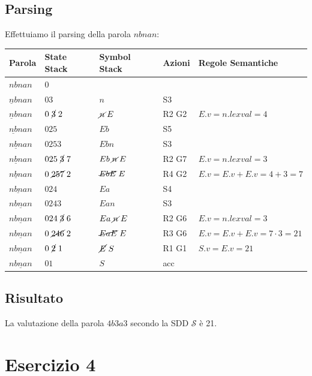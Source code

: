 \documentclass[11pt]{article}
\begin{document}
\subsection*{Parsing}
Effettuiamo il parsing della parola $nbnan$:
\begin{table}[H]
  \begin{tabular}{lllll}
    \textbf{Parola} & \textbf{State Stack} & \textbf{Symbol Stack} & \textbf{Azioni} & \textbf{Regole Semantiche}\\
    \hline
    $nbnan$ & 0 &  \\
    $\underline n bnan$ & $03$ & $n$ & S3 & \\
    $\underline n bnan$ & $0\mathrel{\cancel 3}2$ & $\mathrel{\cancel  n} E$ & R2 G2 & $E.v = n.{lexval} = 4$\\
    $\underline {nb} nan$ & $025$ & $Eb$ & S5 & \\
    $\underline {nbn} an$ & $0253$ & $Ebn$ & S3 & \\
    $\underline {nbn} an$ & $025\mathrel{\cancel 3}7$ & $Eb\mathrel{\cancel  n}E$ & R2 G7 & $E.v = n.{lexval} = 3$\\
    $\underline {nbn} an$ & $0\mathrel{\cancel{257}}2$ & $\mathrel{\cancel{EbE}}E$ & R4 G2 & $E.v = E.v + E.v = 4 + 3 = 7$ \\
    $\underline {nbna} n$ & $024$ & $Ea$ & S4 & \\
    $\underline {nbnan} $ & $0243$ & $Ean$ & S3 & \\
    $\underline {nbnan} $ & $024\mathrel{\cancel 3} 6$ & $Ea\mathrel{\cancel  n} E$ & R2 G6 & $E.v = n.{lexval} = 3$ \\
    $\underline {nbnan} $ & $0\mathrel{\cancel{246}} 2$ & $\mathrel{\cancel{EaE}}E$ & R3 G6 & $E.v = E.v + E.v = 7 \cdot 3 = 21$ \\
    $\underline {nbnan} $ & $0\mathrel{\cancel 2}1$ & $\mathrel{\cancel E}S$ & R1 G1 & $S.v = E.v = 21$ \\
    $\underline {nbnan} $ & $01$ & $S$ & acc &  \\
  \end{tabular}
\label{tab:03-parsing-a}
\end{table}
\subsection*{Risultato}
La valutazione della parola $4b3a3$ secondo la SDD $\mathcal S$ è 21.
\newpage
\section*{Esercizio 4}
\end{document}
